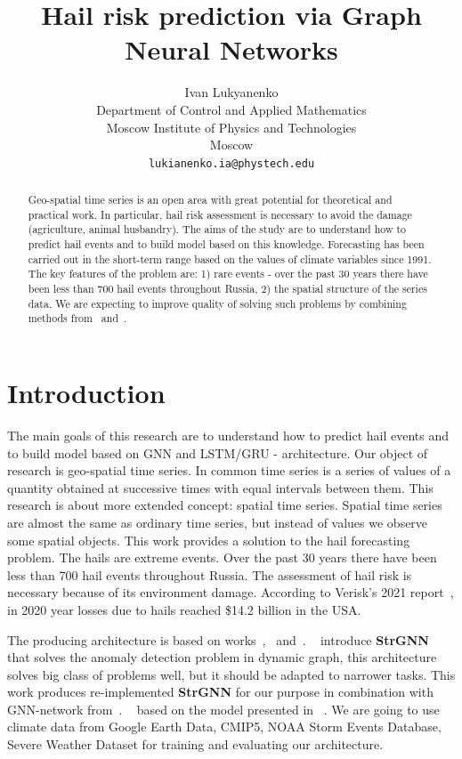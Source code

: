 \documentclass{article}
\title{Hail risk prediction via Graph Neural Networks}
\author{ Ivan Lukyanenko \\
	Department of Control and Applied Mathematics\\
	Moscow Institute of Physics and Technologies\\
	Moscow \\
	\texttt{lukianenko.ia@phystech.edu} \\
}
\date{}
\begin{document}
\fontsize{12}{14pt}\selectfont
\maketitle

\begin{abstract}
	Geo-spatial time series is an open area with great potential for theoretical and practical work. In particular, hail risk assessment is necessary to avoid the damage (agriculture, animal husbandry). The aims of the study are to understand how to predict hail events and to build model based on this knowledge. Forecasting has been carried out in the short-term range based on the values of climate variables since 1991. The key features of the problem are: 1) rare events - over the past 30 years there have been less than 700 hail events throughout Russia, 2) the spatial structure of the series data. We are expecting to improve quality of solving such problems by combining methods from~\cite{DBLP:journals/corr/abs-2012-01598} and~\cite{DBLP:journals/corr/abs-2005-07427}.
\end{abstract}



\section{Introduction}
The main goals of this research are to understand how to predict hail events and to build model based on GNN and LSTM/GRU - architecture. Our object of research is geo-spatial time series. In common time series is a series of values of a quantity obtained at successive times with equal intervals between them. This research is about more extended concept: spatial time series. Spatial time series are almost the same as ordinary time series, but instead of values we observe some spatial objects. This work provides a solution to the hail forecasting problem. The hails are extreme events. Over the past 30 years there have been less than 700 hail events throughout Russia. The assessment of hail risk is necessary because of its environment damage. According to Verisk’s 2021 report~\cite{haillosses}, in 2020 year losses due to hails reached \$14.2 billion in the USA.

The producing architecture is based on works~\cite{DBLP:journals/corr/abs-2012-01598},~\cite{wu2020connecting} and~\cite{DBLP:journals/corr/abs-2005-07427}. ~\cite{DBLP:journals/corr/abs-2005-07427} introduce \textbf{StrGNN} that solves the anomaly detection problem in dynamic graph, this architecture solves big class of problems well, but it should be adapted to narrower tasks. This work produces re-implemented \textbf{StrGNN} for our purpose in combination with GNN-network from~\cite{DBLP:journals/corr/abs-2012-01598}. ~\cite{DBLP:journals/corr/abs-2012-01598} based on the model presented in ~\cite{wu2020connecting}. We are going to use climate data from Google Earth Data, CMIP5, NOAA Storm Events Database, Severe Weather Dataset for training and evaluating our architecture.
\end{document}
